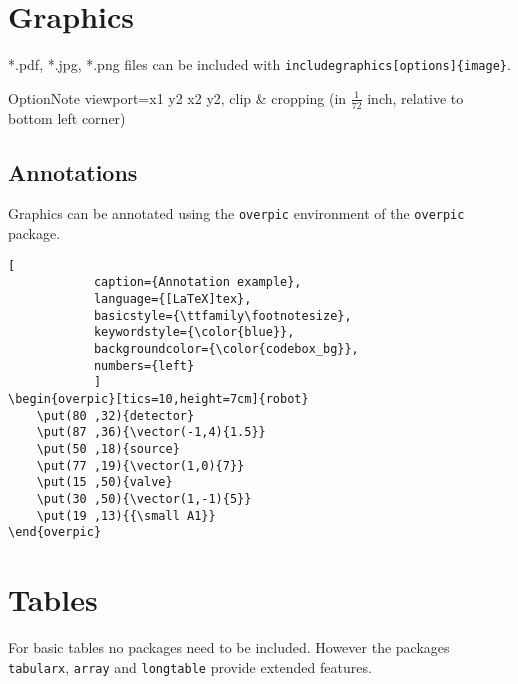 \section{Graphics}
    \label{section:graphics}
    *.pdf, *.jpg, *.png files can be included with \texttt{\bs includegraphics[options]\{image\}}.

    \begin{cmdtabx}{Option}{Note}
        viewport=x1 y2 x2 y2, clip & cropping (in $ \frac{1}{72} $ inch, relative to bottom left corner) \\
    \end{cmdtabx}
    
    \subsection{Annotations}
        Graphics can be annotated using the \texttt{overpic} environment of the \texttt{overpic} package.
        
        \begin{lstlisting}[
            caption={Annotation example},
            language={[LaTeX]tex},
            basicstyle={\ttfamily\footnotesize},
            keywordstyle={\color{blue}},
            backgroundcolor={\color{codebox_bg}},
            numbers={left}
            ]
\begin{overpic}[tics=10,height=7cm]{robot}
    \put(80 ,32){detector}
    \put(87 ,36){\vector(-1,4){1.5}}
    \put(50 ,18){source}
    \put(77 ,19){\vector(1,0){7}}
    \put(15 ,50){valve}
    \put(30 ,50){\vector(1,-1){5}}
    \put(19 ,13){{\small A1}}
\end{overpic}
        \end{lstlisting}

\section{Tables}
    For basic tables no packages need to be included. However the packages \texttt{tabularx}, \texttt{array} and \texttt{longtable} provide extended features.

